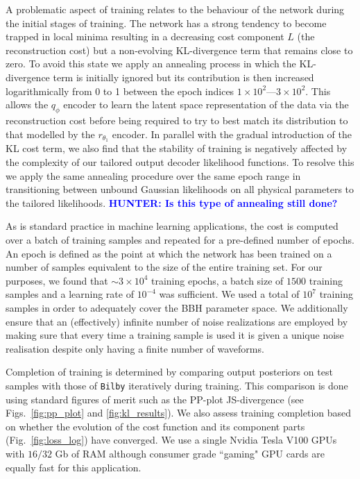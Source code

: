 \documentclass[%
showpacs,
nofootinbib,
 amsmath,amssymb,
 aps,
 twocolumn,
 prl,
 reprint,
floatfix,
]{revtex4-1}
\newcommand{\hunter}[1]{\textbf{\textcolor{blue}{HUNTER: #1}}}
\begin{document}
%
%
A problematic aspect of training relates to the behaviour of the network
during the initial stages of training. The network has a strong tendency to
become trapped in local minima resulting in a decreasing cost component $L$
(the reconstruction cost) but a non-evolving \ac{KL}-divergence term that
remains close to zero. To avoid this state we apply an annealing process in
which the \ac{KL}-divergence term is initially ignored but its contribution is
then increased logarithmically from 0 to 1 between the epoch indices
$1\times10^2$---$3\times10^2$. 
 This allows the $q_{\phi}$ encoder to learn the latent space
representation of the data via the reconstruction cost before being required to
try to best match its distribution to that modelled by the $r_{\theta_1}$
encoder. In parallel with the gradual introduction of the \ac{KL} cost term, we
also find that the stability of training is negatively affected by the
complexity of our tailored output decoder likelihood functions. To resolve this
we apply the same annealing procedure over the same epoch range in transitioning
between unbound Gaussian likelihoods on all physical parameters to the tailored
likelihoods.   \hunter{Is this type of annealing still done?}

%
%
As is standard practice in machine learning applications, the cost is computed
over a batch of training samples and repeated for a pre-defined number of
epochs. An epoch is defined as the point at which the network has been trained 
on a number of samples equivalent to the size of the entire training set. 
For our purposes, we found that $\sim 3 \times 10^4$ training
epochs, a batch size of $1500$ training samples and a learning rate of
$10^{-4}$ was sufficient. We used a total of $10^7$ training samples in order
to adequately cover the \ac{BBH} parameter space. We additionally ensure that
an (effectively) infinite number of noise realizations are employed by making
sure that every time a training sample is used it is given a unique noise
realisation despite only having a finite number of waveforms.

%
%
Completion of training is determined by comparing output posteriors on test
samples with those of \texttt{Bilby} iteratively during training. This
comparison is done using standard figures of merit such as the \ac{PP}-plot
\ac{JS}-divergence (see Figs.~\ref{fig:pp_plot} and
\ref{fig:kl_results}). We also assess training completion based on whether the
evolution of the cost function and its component parts
(Fig.~\ref{fig:loss_log}) have converged. We use a single Nvidia Tesla V100
\acp{GPU} with $16/32$ Gb of RAM although consumer grade ``gaming" \ac{GPU}
cards are equally fast for this application.
\end{document}
